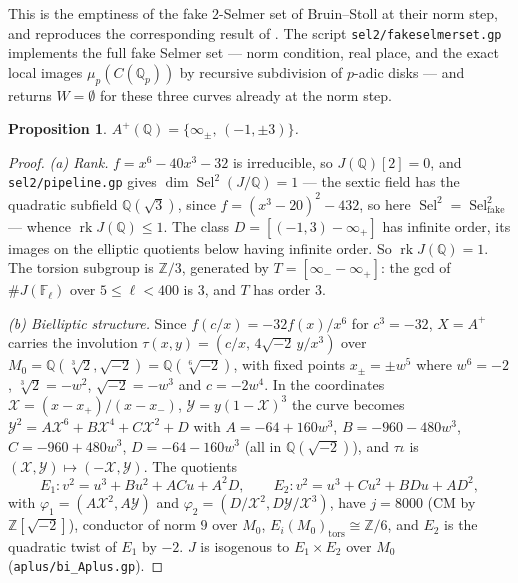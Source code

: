 \documentclass[11pt,reqno]{amsart}
\theoremstyle{plain}
\newtheorem{proposition}[theorem]{Proposition}
\theoremstyle{definition}
\newcommand{\Q}{\mathbb{Q}}
\newcommand{\Z}{\mathbb{Z}}
\newcommand{\FF}{\mathbb{F}}
\DeclareMathOperator{\rk}{rk}
\DeclareMathOperator{\Sel}{Sel}
\newcommand{\tors}{\mathrm{tors}}
\newcommand{\fake}{\mathrm{fake}}
\numberwithin{equation}{section}
\begin{document}
This is the emptiness of the fake $2$-Selmer set of Bruin--Stoll
\cite{BruinStoll} at their norm step, and reproduces the corresponding result of
\cite{Villines}. The script \texttt{sel2/fakeselmerset.gp} implements the full
fake Selmer set --- norm condition, real place, and the exact local images
$\mu_{p}(C(\Q_{p}))$ by recursive subdivision of $p$-adic disks --- and returns
$W=\emptyset$ for these three curves already at the norm step.

\begin{proposition}\label{prop:B2}
$A^{+}(\Q)=\{\infty_{\pm},\,(-1,\pm3)\}$.
\end{proposition}

\begin{proof}
\emph{(a) Rank.} $f=x^{6}-40x^{3}-32$ is irreducible, so $J(\Q)[2]=0$, and
\texttt{sel2/pipeline.gp} gives $\dim\Sel^{2}(J/\Q)=1$ --- the sextic field has
the quadratic subfield $\Q(\sqrt3)$, since $f=(x^{3}-20)^{2}-432$, so here
$\Sel^{2}=\Sel^{2}_{\fake}$ --- whence $\rk J(\Q)\le1$. The class
$D=[(-1,3)-\infty_{+}]$ has infinite order, its images on the elliptic quotients
below having infinite order. So $\rk J(\Q)=1$. The torsion subgroup is
$\Z/3$, generated by $T=[\infty_{-}-\infty_{+}]$: the gcd of $\#J(\FF_{\ell})$
over $5\le\ell<400$ is $3$, and $T$ has order $3$.

\emph{(b) Bielliptic structure.} Since $f(c/x)=-32f(x)/x^{6}$ for $c^{3}=-32$,
$X=A^{+}$ carries the involution $\tau(x,y)=(c/x,\,4\sqrt{-2}\,y/x^{3})$ over
$M_{0}=\Q(\sqrt[3]{2},\sqrt{-2})=\Q(\sqrt[6]{-2})$, with fixed points
$x_{\pm}=\pm w^{5}$ where $w^{6}=-2$, $\sqrt[3]{2}=-w^{2}$, $\sqrt{-2}=-w^{3}$
and $c=-2w^{4}$. In the coordinates $\mathcal{X}=(x-x_{+})/(x-x_{-})$,
$\mathcal{Y}=y(1-\mathcal{X})^{3}$ the curve becomes
$\mathcal{Y}^{2}=A\mathcal{X}^{6}+B\mathcal{X}^{4}+C\mathcal{X}^{2}+D$ with
$A=-64+160w^{3}$, $B=-960-480w^{3}$, $C=-960+480w^{3}$, $D=-64-160w^{3}$ (all in
$\Q(\sqrt{-2})$), and $\tau\iota$ is $(\mathcal{X},\mathcal{Y})\mapsto(-\mathcal{X},\mathcal{Y})$.
The quotients
\[
  E_{1}\colon v^{2}=u^{3}+Bu^{2}+ACu+A^{2}D,\qquad
  E_{2}\colon v^{2}=u^{3}+Cu^{2}+BDu+AD^{2},
\]
with $\varphi_{1}=(A\mathcal{X}^{2},A\mathcal{Y})$ and
$\varphi_{2}=(D/\mathcal{X}^{2},D\mathcal{Y}/\mathcal{X}^{3})$, have $j=8000$ (CM
by $\Z[\sqrt{-2}]$), conductor of norm $9$ over $M_{0}$,
$E_{i}(M_{0})_{\tors}\cong\Z/6$, and $E_{2}$ is the quadratic twist of $E_{1}$
by $-2$. $J$ is isogenous to $E_{1}\times E_{2}$ over $M_{0}$
(\texttt{aplus/bi\_Aplus.gp}).


\end{proof}
\end{document}
